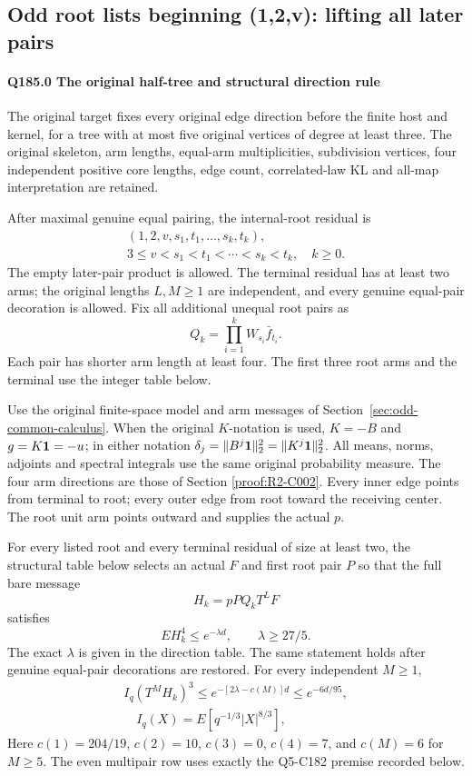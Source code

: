 \subsection{Odd root lists beginning (1,2,v): lifting all later pairs}\label{proof:Q5-C185}
\paragraph{Q185.0 The original half-tree and structural direction rule}

The original target fixes every original edge direction before the finite host and kernel, for a tree with at most five original vertices of degree at least three. The original skeleton, arm lengths, equal-arm multiplicities, subdivision vertices, four independent positive core lengths, edge count, correlated-law KL and all-map interpretation are retained.

After maximal genuine equal pairing, the internal-root residual is
\[
\begin{gathered}
(1,2,v,s_1,t_1,\ldots,s_k,t_k),\quad\\
3\le v<s_1<t_1<\cdots<s_k<t_k,\quad k\ge0.
\end{gathered}\tag{Q185.1}
\]
The empty later-pair product is allowed. The terminal residual has at least two arms; the original lengths \(L,\allowbreak \allowbreak  M\ge1\) are independent, and every genuine equal-pair decoration is allowed. Fix all additional unequal root pairs as
\[
 Q_k=\prod_{i=1}^k W_{s_i}\bar f_{t_i}.                      \tag{Q185.2}
\]
Each pair has shorter arm length at least four. The first three root arms and the terminal use the integer table below.

Use the original finite-space model and arm messages of
Section~\ref{sec:odd-common-calculus}.
When the original \(K\)-notation is used, \(K=-B\) and
\(g=K\mathbf1=-u\); in either notation
\(\delta_j=\|B^j\mathbf1\|_2^2=\|K^j\mathbf1\|_2^2\).
All means, norms, adjoints and spectral integrals use the same
original probability measure.
The four arm directions are those of Section \ref{proof:R2-C002}. Every inner edge points from terminal to root; every outer edge from root toward the receiving center. The root unit arm points outward and supplies the actual \(p\).

For every listed root and every terminal residual of size at least two, the structural table below selects an actual \(F\) and first root pair \(P\) so that the full bare message
\[
 H_k=pP Q_k T^LF
\]
satisfies
\[
 EH_k^4\le e^{-\lambda d},\qquad \lambda\ge27/5.         \tag{Q185.3}
\]
The exact \(\lambda\) is given in the direction table. The same statement holds after genuine equal-pair decorations are restored. For every independent \(M\ge1\),
\[
\begin{gathered}
I_q(T^MH_k)^3\le e^{-[2\lambda-c(M)]d}\le e^{-6d/95},\\
\quad I_q(X)=E[q^{-1/3}|X|^{8/3}],
\end{gathered}\tag{Q185.4}
\]
Here \(c(1)=204/19\), \(c(2)=10\), \(c(3)=0\), \(c(4)=7\), and \(c(M)=6\) for \(M\ge5\). The even multipair row uses exactly the Q5-C182 premise recorded below.


